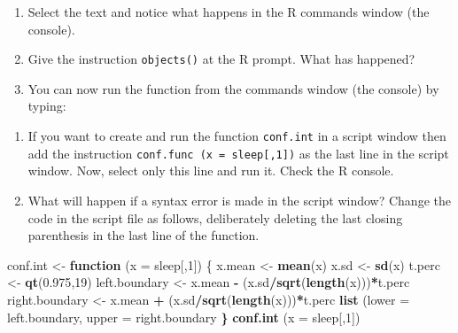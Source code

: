\documentclass[
]{book}
\newenvironment{Shaded}{\begin{snugshade}}{\end{snugshade}}
\newcommand{\AttributeTok}[1]{\textcolor[rgb]{0.13,0.29,0.53}{#1}}
\newcommand{\CommentTok}[1]{\textcolor[rgb]{0.56,0.35,0.01}{\textit{#1}}}
\newcommand{\ControlFlowTok}[1]{\textcolor[rgb]{0.13,0.29,0.53}{\textbf{#1}}}
\newcommand{\DecValTok}[1]{\textcolor[rgb]{0.00,0.00,0.81}{#1}}
\newcommand{\ErrorTok}[1]{\textcolor[rgb]{0.64,0.00,0.00}{\textbf{#1}}}
\newcommand{\FloatTok}[1]{\textcolor[rgb]{0.00,0.00,0.81}{#1}}
\newcommand{\FunctionTok}[1]{\textcolor[rgb]{0.13,0.29,0.53}{\textbf{#1}}}
\newcommand{\NormalTok}[1]{#1}
\newcommand{\OtherTok}[1]{\textcolor[rgb]{0.56,0.35,0.01}{#1}}
\newcommand{\SpecialCharTok}[1]{\textcolor[rgb]{0.81,0.36,0.00}{\textbf{#1}}}
\providecommand{\tightlist}{%
  \setlength{\itemsep}{0pt}\setlength{\parskip}{0pt}}
\begin{document}
\begin{enumerate}
\def\labelenumi{(\alph{enumi})}
\setcounter{enumi}{9}
\tightlist
\item
  Select the text and notice what happens in the R commands window (the console).
\item
  Give the instruction \texttt{objects()} at the R prompt. What has happened?
\item
  You can now run the function from the commands window (the console) by typing:
\end{enumerate}

\begin{Shaded}
\end{Shaded}

\begin{enumerate}
\def\labelenumi{(\alph{enumi})}
\setcounter{enumi}{11}
\tightlist
\item
  If you want to create and run the function \texttt{conf.int} in a script window then add the instruction \texttt{conf.func\ (x\ =\ sleep{[},1{]})} as the last line in the script window. Now, select only this line and run it. Check the R console.
\item
  What will happen if a syntax error is made in the script window? Change the code in the script file as follows, deliberately deleting the last closing parenthesis in the last line of the function.
\end{enumerate}

\begin{Shaded}
\begin{Highlighting}[]
\NormalTok{conf.int }\OtherTok{\textless{}{-}} \ControlFlowTok{function}\NormalTok{ (}\AttributeTok{x =}\NormalTok{ sleep[,}\DecValTok{1}\NormalTok{])}
\NormalTok{\{}
\NormalTok{  x.mean }\OtherTok{\textless{}{-}} \FunctionTok{mean}\NormalTok{(x)   }
\NormalTok{  x.sd }\OtherTok{\textless{}{-}} \FunctionTok{sd}\NormalTok{(x)    }
\NormalTok{  t.perc }\OtherTok{\textless{}{-}} \FunctionTok{qt}\NormalTok{(}\FloatTok{0.975}\NormalTok{,}\DecValTok{19}\NormalTok{) }
\NormalTok{  left.boundary }\OtherTok{\textless{}{-}}\NormalTok{ x.mean }\SpecialCharTok{{-}}\NormalTok{ (x.sd}\SpecialCharTok{/}\FunctionTok{sqrt}\NormalTok{(}\FunctionTok{length}\NormalTok{(x)))}\SpecialCharTok{*}\NormalTok{t.perc }
\NormalTok{  right.boundary }\OtherTok{\textless{}{-}}\NormalTok{ x.mean }\SpecialCharTok{+}\NormalTok{ (x.sd}\SpecialCharTok{/}\FunctionTok{sqrt}\NormalTok{(}\FunctionTok{length}\NormalTok{(x)))}\SpecialCharTok{*}\NormalTok{t.perc}
  \FunctionTok{list}\NormalTok{ (}\AttributeTok{lower =}\NormalTok{ left.boundary, }\AttributeTok{upper =}\NormalTok{ right.boundary}
\ErrorTok{\}}
\FunctionTok{conf.int}\NormalTok{ (}\AttributeTok{x =}\NormalTok{ sleep[,}\DecValTok{1}\NormalTok{])}
\end{Highlighting}
\end{Shaded}
\end{document}
